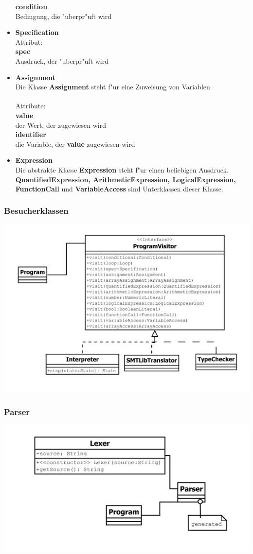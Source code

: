 \documentclass[10pt,a4paper,titlepage]{article}
\begin{document}
\begin{itemize}
\textbf{condition} \\
Bedingung, die "uberpr"uft wird
\item \textbf{Specification} \\
Attribut: \\
\textbf{spec} \\
Ausdruck, der "uberpr"uft wird
\item \textbf{Assignment} \\
Die Klasse \textbf{Assignment} steht f"ur eine Zuweisung von Variablen. \\\\
Attribute: \\
\textbf{value} \\
der Wert, der zugewiesen wird\\
\textbf{identifier} \\
die Variable, der \textbf{value} zugewiesen wird 
\item \textbf{Expression} \\
Die abstrakte Klasse \textbf{Expression} steht f"ur einen beliebigen Ausdruck. \textbf{QuantifiedExpression, ArithmeticExpression, LogicalExpression, FunctionCall} und \textbf{VariableAccess} sind Unterklassen dieser Klasse.
\end{itemize}
\subsubsection{Besucherklassen}
\includegraphics[scale=0.7]{images/Besucher.pdf}
\subsubsection{Parser}
\includegraphics[scale=0.6]{images/Parser.pdf}
\end{document}
